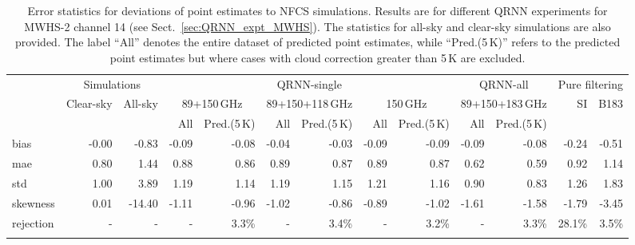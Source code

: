 \documentclass[amt, manuscript]{copernicus}
\begin{document}
\begin{table}[t]
	\caption{Error statistics for deviations of point estimates to NFCS simulations. Results are for different QRNN experiments for MWHS-2 channel 14 (see Sect.~\ref{sec:QRNN_expt_MWHS}). The statistics for all-sky and clear-sky simulations are also provided. The label ``All'' denotes the entire dataset of predicted point estimates, while ``Pred.(5\,K)'' refers to the predicted point estimates but where cases with cloud correction greater than 5\,K are excluded. }
	\label{tab:error_statistics_mwhs_14}
	\setlength{\tabcolsep}{4pt}
	\begin{tabular}{lrr|rr|rr|rr|rr|rr}
		\tophline
		&\multicolumn{2}{c|}{Simulations}& \multicolumn{6}{c|}{QRNN-single} & \multicolumn{2}{c|}{QRNN-all} & \multicolumn{2}{c}{Pure filtering}\\
		\cline{3-13}
		&   Clear-sky &   All-sky &  \multicolumn{2}{c|}{89+150\,GHz} & \multicolumn{2}{c|}{89+150+118\,GHz} & \multicolumn{2}{c|}{150\,GHz} & \multicolumn{2}{c|}{89+150+183\,GHz}& SI & B183\\		
		&			   &			& All & Pred.(5\,K) & All & Pred.(5\,K) & All & Pred.(5\,K)  & All & Pred.(5\,K)&&\\
		\middlehline
bias     & -0.00 &  -0.83 & -0.09 & -0.08 & -0.04 & -0.03 & -0.09 & -0.09 & -0.09 & -0.08 & -0.24 & -0.51\\
mae      &  0.80 &   1.44 &  0.88 &  0.86 &  0.89 &  0.87 &  0.89 &  0.87 &  0.62 &  0.59 &  0.92 &  1.14\\
std      &  1.00 &   3.89 &  1.19 &  1.14 &  1.19 &  1.15 &  1.21 &  1.16 &  0.90 &  0.83 &  1.26 &  1.83\\
skewness &  0.01 & -14.40 & -1.11 & -0.96 & -1.02 & -0.86 & -0.89 & -1.02 & -1.61 & -1.58 & -1.79 & -3.45\\
rejection&  -	 & - 	  & - 	  & 3.3\% & - 	  & 3.4\% & -     & 3.2\% & -     & 3.3\% & 28.1\%& 3.5\%\\
\bottomhline
	\end{tabular}
\end{table}
\end{document}
